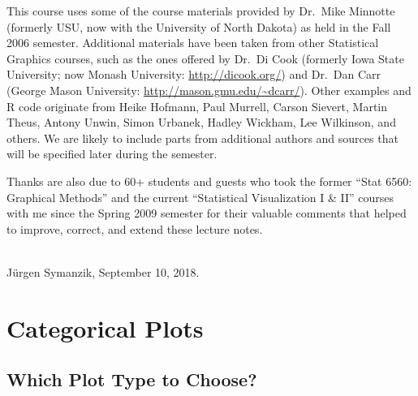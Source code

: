\documentclass[12pt,letterpaper,final]{article}
\begin{document}
This course uses some of the course materials provided by
Dr.\ Mike Minnotte (formerly USU, now with the University of
North Dakota) as held in the Fall 2006 semester. Additional materials
have been taken from other Statistical Graphics courses, such as the
ones offered by Dr.\ Di Cook (formerly Iowa State University; now Monash University:
\url{http://dicook.org/}) and
Dr.\ Dan Carr (George Mason University: \url{http://mason.gmu.edu/~dcarr/}).
Other examples and R code originate from 
Heike Hofmann, Paul Murrell, Carson Sievert,
Martin Theus, Antony Unwin, Simon Urbanek, 
Hadley Wickham, Lee Wilkinson, and others.
We are likely to include parts from additional authors and sources
that will be specified later during the semester.

Thanks are also due to 60+ students and guests who took 
the former ``Stat 6560: Graphical Methods'' and
the current ``Statistical Visualization I \& II'' courses
with me since the Spring 2009 semester 
for their valuable comments that helped
to improve, correct, and extend these lecture notes.

~\\
J\"urgen Symanzik, September 10, 2018.



\newpage

%
{}

\newpage


\setcounter{page}{1}


\def\jsprivatechfour{1} %


\section{Categorical Plots}



\subsection{Which Plot Type to Choose?}\label{WhichPlotTypeToChoose}
\end{document}
